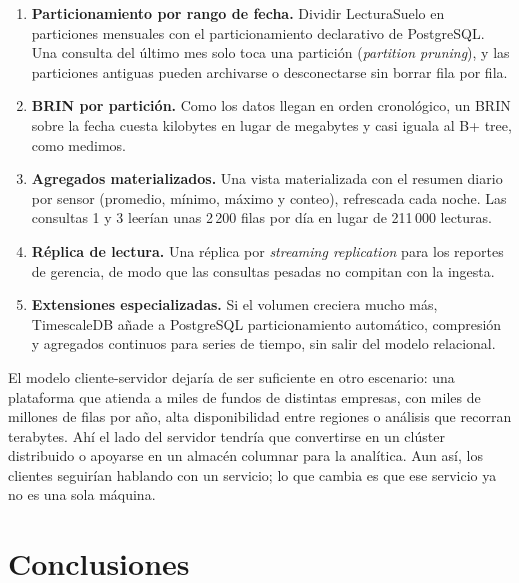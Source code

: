 \documentclass[11pt,letterpaper]{article}
\newcommand{\tbus}{\textunderscore\allowbreak}
\newcommand{\tb}[1]{{\ttfamily\let\_\tbus #1}}
\begin{document}
\begin{enumerate}[leftmargin=1.6em,itemsep=0.15em]
\item \textbf{Particionamiento por rango de fecha.} Dividir \tb{Lectura\_Suelo} en particiones mensuales con el particionamiento declarativo de PostgreSQL. Una consulta del último mes solo toca una partición (\emph{partition pruning}), y las particiones antiguas pueden archivarse o desconectarse sin borrar fila por fila.
\item \textbf{BRIN por partición.} Como los datos llegan en orden cronológico, un BRIN sobre la fecha cuesta kilobytes en lugar de megabytes y casi iguala al B+ tree, como medimos.
\item \textbf{Agregados materializados.} Una vista materializada con el resumen diario por sensor (promedio, mínimo, máximo y conteo), refrescada cada noche. Las consultas 1 y 3 leerían unas 2\,200 filas por día en lugar de 211\,000 lecturas.
\item \textbf{Réplica de lectura.} Una réplica por \emph{streaming replication} para los reportes de gerencia, de modo que las consultas pesadas no compitan con la ingesta.
\item \textbf{Extensiones especializadas.} Si el volumen creciera mucho más, TimescaleDB añade a PostgreSQL particionamiento automático, compresión y agregados continuos para series de tiempo, sin salir del modelo relacional.
\end{enumerate}

El modelo cliente-servidor dejaría de ser suficiente en otro escenario: una plataforma que atienda a miles de fundos de distintas empresas, con miles de millones de filas por año, alta disponibilidad entre regiones o análisis que recorran terabytes. Ahí el lado del servidor tendría que convertirse en un clúster distribuido o apoyarse en un almacén columnar para la analítica. Aun así, los clientes seguirían hablando con un servicio; lo que cambia es que ese servicio ya no es una sola máquina.

\section{Conclusiones}
\end{document}
